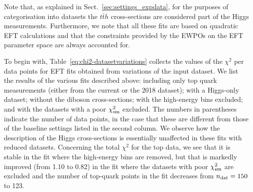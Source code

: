 Note that, as explained in Sect.~\ref{sec:settings_expdata}, for the purposes
of categorisation into datasets
the $t\bar{t}h$ cross-sections are considered part of the Higgs measurements.
%
Furthermore, we note that all these fits are based on  quadratic EFT calculations
and that the constraints provided by the EWPOs on
the EFT parameter space are always accounted for.



To begin with,  Table~\ref{eq:chi2-datasetvariations}
collects the values of the $\chi^2$ per data points for EFT fits obtained from
variations of the input dataset.
%
We list the results of the various fits described above:
including only  top quark measurements (either from the current or the 2018
dataset); with a Higgs-only dataset; without the diboson cross-sections; with the high-energy bins excluded;
and with the datasets with a poor $\chi^2_{\rm sm}$ excluded.
%
The numbers in parentheses indicate the number of data points, in the case that these are different
from those of the baseline settings listed in the second column.
%
We observe how the description of the Higgs cross-sections is essentially
unaffected in these fits with reduced datasets.
%
Concerning the total $\chi^2$ for the top data, we see that it is stable in the fit
where the high-energy bins are removed, but that is markedly improved (from 1.10 to 0.82)
in the fit where the datasets with poor $\chi^2_{\rm sm}$ are excluded
and the number of top-quark points in the fit decreases from $n_{\rm dat}=150$
to 123.

